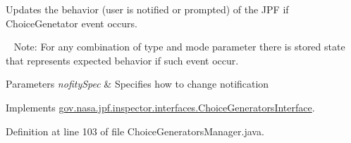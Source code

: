 Updates the behavior (user is notified or prompted) of the J\+PF if Choice\+Genetator event occurs. 

~\newline
Note\+: For any combination of type and mode parameter there is stored state that represents expected behavior if such event occur.


\begin{DoxyParams}{Parameters}
{\em nofity\+Spec} & Specifies how to change notification \\
\hline
\end{DoxyParams}


Implements \hyperlink{interfacegov_1_1nasa_1_1jpf_1_1inspector_1_1interfaces_1_1_choice_generators_interface_a7c85aa8be525bc12e0fcacfbdb7e3094}{gov.\+nasa.\+jpf.\+inspector.\+interfaces.\+Choice\+Generators\+Interface}.



Definition at line 103 of file Choice\+Generators\+Manager.\+java.


